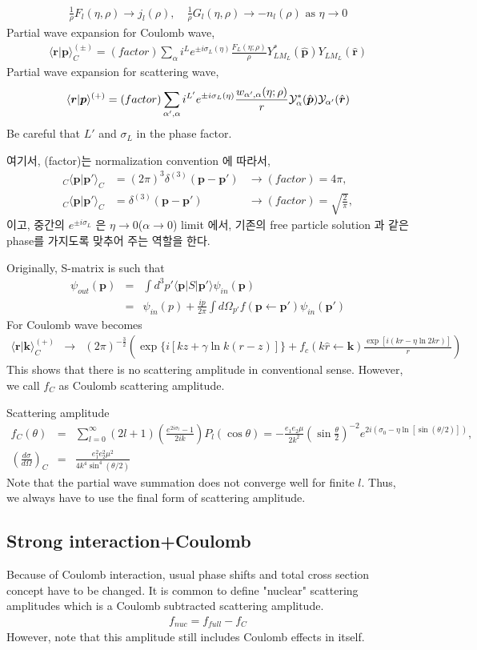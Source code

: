 \documentclass[10pt]{article}
\def\bm{\boldsymbol}
\newcommand{\bea}{\begin{eqnarray}}
\newcommand{\eea}{\end{eqnarray}}
\newcommand{\no}{\nonumber \\}
\def\vp{{\bm p}}
\def\vk{{\bm k}}
\def\vr{{\bm r}}
\def\la{\langle}
\def\ra{\rangle}
\begin{document}
\bea
\frac{1}{\rho}F_{l}(\eta,\rho)\to j_l(\rho),\quad
\frac{1}{\rho}G_l(\eta,\rho)\to -n_l(\rho) \mbox{ as } \eta\to 0
\eea
Partial wave expansion for Coulomb wave,
\bea
\la \vr|\vp\ra^{(\pm)}_C
=(factor)\sum_{\alpha} i^{L} e^{\pm i\sigma_L(\eta)}
         \frac{F_L(\eta;\rho)}{\rho}
         Y_{L M_L}^*(\hat{\vp}) Y_{L M_L}(\hat{\vr})
\eea
Partial wave expansion for scattering wave,
\bea
\la \vr|\vp\ra^{(+)}
=(factor)\sum_{\alpha',\alpha} i^{L'} e^{\pm i\sigma_L(\eta)}
         \frac{w_{\alpha',\alpha}(\eta;\rho)}{r}
         {\cal Y}_{\alpha}^*(\hat{\vp}) {\cal Y}_{\alpha'}(\hat{\vr})
\eea
Be careful that $L'$ and $\sigma_L$ in the phase factor.

여기서, (factor)는 normalization convention 에 따라서,
\begin{equation}
\begin{array}{lll}
{}_C\la \vp|\vp'\ra_C &=(2\pi)^3\delta^{(3)}(\vp-\vp') &\to (factor)=4\pi,\no
{}_C\la \vp|\vp'\ra_C &=\delta^{(3)}(\vp-\vp') &\to (factor)=\sqrt{\frac{2}{\pi}},
\end{array}
\end{equation}
이고, 중간의 $e^{\pm i\sigma_L}$ 은 $\eta\to 0$($\alpha\to 0$) limit 에서,
기존의 free particle solution 과 같은 phase를 가지도록 맞추어 주는 역할을 한다.

Originally, S-matrix is such that
\bea
\psi_{out}(\vp)&=&\int d^3 p'\la \vp|S|\vp'\ra \psi_{in}(\vp)\no
               &=&\psi_{in}(p)+\frac{ip}{2\pi}\int d\Omega_{p'}
                  f(\vp\leftarrow \vp') \psi_{in}(\vp') 
\eea
For Coulomb wave becomes
\bea
\la \vr|\vk\ra^{(+)}_C
&\to& (2\pi)^{-\frac{3}{2}}
    \left( \exp\{ i[k z+\gamma \ln k(r-z)]\}
         +f_c(k\hat{r}\leftarrow\vk)
          \frac{\exp[i(kr-\eta\ln 2k r)]}{r}\right)
\eea
This shows that there is no scattering amplitude in conventional sense.
However, we call $f_C$ as Coulomb scattering amplitude.

Scattering amplitude
\bea
f_C(\theta)&=&\sum_{l=0}^{\infty} (2l+1)\left(\frac{e^{2i\sigma_l}-1}{2ik}\right)P_l(\cos\theta)
 =-\frac{e_1 e_2 \mu}{2 k^2}\left(\sin\frac{\theta}{2}\right)^{-2}
  e^{2i(\sigma_0-\eta\ln[\sin(\theta/2)])},\no
\left(\frac{d\sigma}{d\Omega}\right)_C
&=&\frac{ e_1^2 e_2^2 \mu^2}{4 k^4\sin^4(\theta/2)}
\eea
Note that the partial wave summation does not converge well for finite $l$.
Thus, we always have to use the final form of scattering amplitude.


\subsection{Strong interaction+Coulomb}
Because of Coulomb interaction, usual phase shifts
and total cross section concept have to be changed.
It is common to define "nuclear" scattering amplitudes
which is a Coulomb subtracted scattering amplitude.
\bea
f_{nuc}=f_{full}-f_C
\eea
However, note that this amplitude still includes Coulomb 
effects in itself. 
\end{document}
